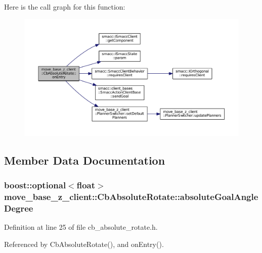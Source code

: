 Here is the call graph for this function\+:
\nopagebreak
\begin{figure}[H]
\begin{center}
\leavevmode
\includegraphics[width=350pt]{classmove__base__z__client_1_1CbAbsoluteRotate_ab5537a52d9ddb242be60e6f9e0b231af_cgraph}
\end{center}
\end{figure}




\subsection{Member Data Documentation}
\subsubsection[{\texorpdfstring{absolute\+Goal\+Angle\+Degree}{absoluteGoalAngleDegree}}]{\setlength{\rightskip}{0pt plus 5cm}boost\+::optional$<$float$>$ move\+\_\+base\+\_\+z\+\_\+client\+::\+Cb\+Absolute\+Rotate\+::absolute\+Goal\+Angle\+Degree}\hypertarget{classmove__base__z__client_1_1CbAbsoluteRotate_a3732ce20b520f9df9408f849ff809a19}{}\label{classmove__base__z__client_1_1CbAbsoluteRotate_a3732ce20b520f9df9408f849ff809a19}


Definition at line 25 of file cb\+\_\+absolute\+\_\+rotate.\+h.



Referenced by Cb\+Absolute\+Rotate(), and on\+Entry().

